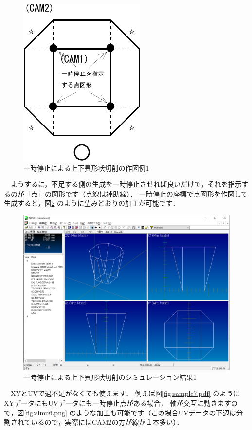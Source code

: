 \begin{figure}[H]
\centering
\includegraphics{No2/fig/sample6-crop.pdf}
\caption{一時停止による上下異形状切削の作図例1}
\label{fig:sample6.pdf}
\end{figure}

　ようするに，不足する側の生成を一時停止させれば良いだけで，それを指示するのが「点」の図形です（点線は補助線）．
一時停止の座標で点図形を作図して生成すると，図\ref{fig:simu5.png} のように望みどおりの加工が可能です．

\begin{figure}[H]
\centering
\includegraphics[scale=0.5]{No2/fig/simu5.png}
\caption{一時停止による上下異形状切削のシミュレーション結果1}
\label{fig:simu5.png}
\end{figure}

　XYとUVで過不足がなくても使えます．
例えば図\ref{fig:sample7.pdf} のようにXYデータにもUVデータにも一時停止点がある場合，
軸が交互に動きますので，図\ref{fig:simu6.png} のような加工も可能です（この場合UVデータの下辺は分割されているので，実際にはCAM2の方が線が１本多い）．



